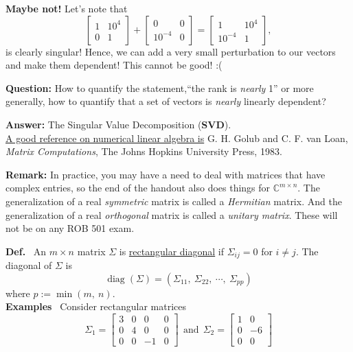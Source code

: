 \documentclass[letterpaper]{article}
\newcommand{\cp}{\mathbb C}    %
\begin{document}
\textbf{Maybe not!} Let's note that
 $$\left[ \begin{array}{ll} 1 & 10^4 \\0& 1\end{array} \right] +  \left[ \begin{array}{ll} 0 & 0 \\10^{-4}& 0\end{array} \right]  =  \left[ \begin{array}{ll} 1 & 10^4 \\10^{-4}& 1\end{array} \right],$$
 is clearly singular! Hence, we can add a very small perturbation to our vectors and make them dependent! This cannot be good! :(

\noindent \textbf{Question:} How to quantify the statement,``the rank is \textit{nearly} 1'' or more generally, how to quantify that a set of vectors is \textit{nearly} linearly dependent?

\noindent \textbf{Answer:} The Singular Value Decomposition (\textbf{SVD}).\\


\noindent \underline{A good reference on numerical linear algebra is} G. H. Golub and C. F. van Loan, \textit{Matrix Computations}, The Johns Hopkins University Press, 1983.


\noindent \textbf{Remark:} In practice, you may have a need to deal with matrices that have complex entries, so the end of the handout also does things for $\cp^{m \times n}$. The generalization of a real \textit{symmetric} matrix is called a \textit{Hermitian} matrix. And the generalization of a real \textit{orthogonal} matrix is called a \textit{unitary matrix}. These will not be on any ROB 501 exam.



\noindent \textbf{Def.}~ An $m\times n$ matrix $\Sigma$ is \underline{rectangular diagonal} if $\Sigma_{ij}=0$ for $i\neq j$.  The diagonal of $\Sigma$ is
    \begin{equation*}
        \operatorname{diag}\left(\Sigma\right)=\left(\Sigma_{11},\ \Sigma_{22},\ \cdots,\ \Sigma_{pp}\right)
    \end{equation*}
    where $p:=\operatorname{min}(m,\ n)$.\\

\noindent \textbf{Examples}~ Consider rectangular matrices
$$
        \Sigma_1 = \left[ \begin{array}{rrrr}
            3 & 0 & 0 & 0\\
            0 & 4 & 0 & 0\\
            0 & 0 & -1 & 0
        \end{array}\right] ~~\text{and}~~
        \Sigma_2 =  \left[ \begin{array}{rr}
            1 & 0\\
            0 & -6\\
            0 & 0
        \end{array}\right]
$$
\end{document}
